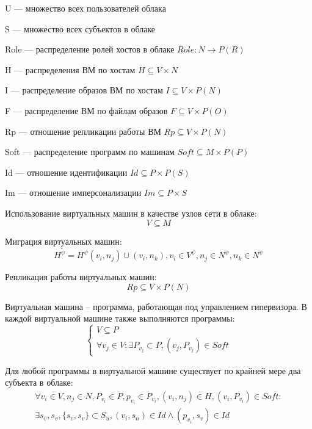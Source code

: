 U --- множество всех пользователей облака

S --- множество всех субъектов в облаке

Role --- распределение ролей хостов в облаке $Role:N \rightarrow P(R)$

H --- распределения ВМ по хостам $H \subseteq V \times N$

I --- распределение образов ВМ по хостам $I \subseteq V \times P(N)$

F --- распределение ВМ по файлам образов $F \subseteq V \times P(O)$

Rp --- отношение репликации работы ВМ $Rp \subseteq V \times P(N)$

Soft --- распределение программ по машинам $Soft \subseteq M \times P(P)$

Id --- отношение идентификации $Id \subseteq P \times P(S)$

Im --- отношение имперсонализации $Im \subseteq P \times S$

Использование виртуальных машин в качестве узлов сети в облаке:
\begin{equation}
V \subseteq M
\end{equation}

Миграция виртуальных машин:
\begin{equation}
H^{\tilde{\psi}} = H^{\psi} (v_i, n_j) \cup (v_i, n_k), v_i \in V^{\psi}, n_j \in N^{\psi}, n_k \in N^{\psi}
\end{equation}

Репликация работы виртуальных машин:
\begin{equation}
Rp \subseteq V \times P(N)
\end{equation}

Виртуальная машина – программа, работающая под управлением гипервизора.
В каждой виртуальной машине также выполняются программы:
\begin{equation}
\left\{\begin{matrix}
V \subseteq P \\
\forall v_j \in V : \exists P_{v_j} \subset P,(v_j,P_{v_j}) \in Soft
\end{matrix}\right.
\end{equation}

Для любой программы в виртуальной машине существует по крайней мере два субъекта в облаке:
\begin{multline}
\forall v_i \in V, n_j \in N, P_{v_i} \in P, p_{v_i} \in P_{v_i}, (v_i, n_j) \in H, (v_i, P_{v_i}) \in Soft : \\
\exists s_v, s_v, \{s_v, s_v\} \subset S_u, (v_i, s_n) \in Id \wedge (p_{v_i}, s_v) \in Id
\end{multline}


